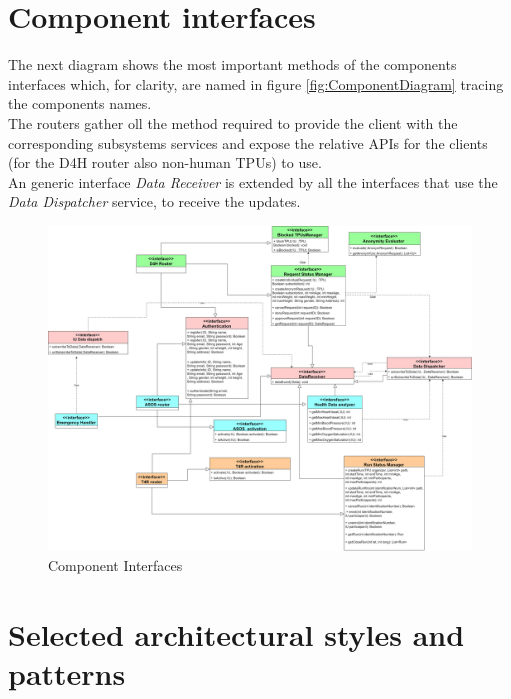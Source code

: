 \section{Component interfaces}
The next diagram shows the most important methods of the components interfaces which, for clarity, are named in figure \ref{fig:ComponentDiagram} tracing the components names.\\
The routers gather oll the method required to provide the client with the corresponding subsystems services and expose the relative APIs for the clients (for the D4H router also non-human TPUs) to use. \\
An generic interface \textit{Data Receiver} is extended by all the interfaces that use the \textit{Data Dispatcher} service, to receive the updates.
\begin{figure}[H]
\caption{Component Interfaces}
\centering
\includegraphics[width = \textwidth]{sections/architecturalDesign/componentInterfaces.png}
\end{figure}
\section{Selected architectural styles and patterns}
